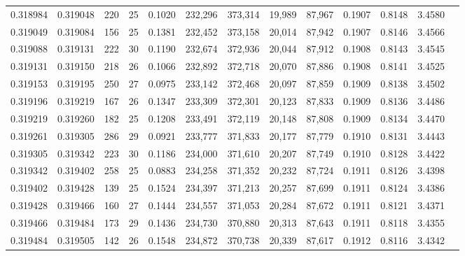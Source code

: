 \begin{tabular}{rrrrrrrrrrrrr}
0.318984 & 0.319048 &   220 &  25 &                                     0.1020 & 232,296 & 373,314 &  19,989 &  87,967 & 0.1907 & 0.8148 & 3.4580 \\
0.319049 & 0.319084 &   156 &  25 &                                     0.1381 & 232,452 & 373,158 &  20,014 &  87,942 & 0.1907 & 0.8146 & 3.4566 \\
0.319088 & 0.319131 &   222 &  30 &                                     0.1190 & 232,674 & 372,936 &  20,044 &  87,912 & 0.1908 & 0.8143 & 3.4545 \\
0.319131 & 0.319150 &   218 &  26 &                                     0.1066 & 232,892 & 372,718 &  20,070 &  87,886 & 0.1908 & 0.8141 & 3.4525 \\
0.319153 & 0.319195 &   250 &  27 &                                     0.0975 & 233,142 & 372,468 &  20,097 &  87,859 & 0.1909 & 0.8138 & 3.4502 \\
0.319196 & 0.319219 &   167 &  26 &                                     0.1347 & 233,309 & 372,301 &  20,123 &  87,833 & 0.1909 & 0.8136 & 3.4486 \\
0.319219 & 0.319260 &   182 &  25 &                                     0.1208 & 233,491 & 372,119 &  20,148 &  87,808 & 0.1909 & 0.8134 & 3.4470 \\
0.319261 & 0.319305 &   286 &  29 &                                     0.0921 & 233,777 & 371,833 &  20,177 &  87,779 & 0.1910 & 0.8131 & 3.4443 \\
0.319305 & 0.319342 &   223 &  30 &                                     0.1186 & 234,000 & 371,610 &  20,207 &  87,749 & 0.1910 & 0.8128 & 3.4422 \\
0.319342 & 0.319402 &   258 &  25 &                                     0.0883 & 234,258 & 371,352 &  20,232 &  87,724 & 0.1911 & 0.8126 & 3.4398 \\
0.319402 & 0.319428 &   139 &  25 &                                     0.1524 & 234,397 & 371,213 &  20,257 &  87,699 & 0.1911 & 0.8124 & 3.4386 \\
0.319428 & 0.319466 &   160 &  27 &                                     0.1444 & 234,557 & 371,053 &  20,284 &  87,672 & 0.1911 & 0.8121 & 3.4371 \\
0.319466 & 0.319484 &   173 &  29 &                                     0.1436 & 234,730 & 370,880 &  20,313 &  87,643 & 0.1911 & 0.8118 & 3.4355 \\
0.319484 & 0.319505 &   142 &  26 &                                     0.1548 & 234,872 & 370,738 &  20,339 &  87,617 & 0.1912 & 0.8116 & 3.4342 \\

\end{tabular}
